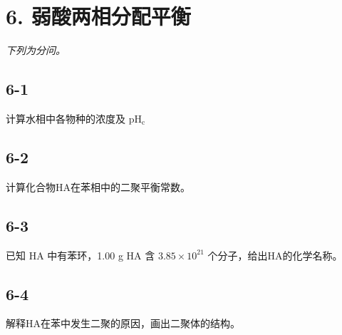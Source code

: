 \section*{6. 弱酸两相分配平衡}
\textit{下列为分问。}

\subsection*{6-1}
计算⽔相中各物种的浓度及 $\mathrm { p H _ { c } }$

\subsection*{6-2}
计算化合物HA在苯相中的⼆聚平衡常数。

\subsection*{6-3}
已知 HA 中有苯环，1.00 g HA 含 $3 . 8 5 \times 1 0 ^ { 2 1 }$ 个分⼦，给出HA的化学名称。

\subsection*{6-4}
解释HA在苯中发⽣⼆聚的原因，画出⼆聚体的结构。
